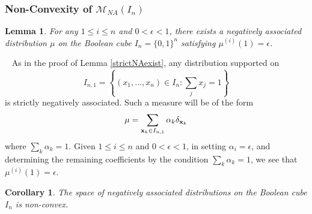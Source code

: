 \documentclass[11pt]{article}
\newcommand{\m}{\mathcal{M}}
\newtheorem{lemma}{Lemma}
\newtheorem{cor}{Corollary}
\newenvironment{Proof}{\noindent{\bf Proof} \ }{\QED}\smallskip
\newcommand\QED{\newline \rightline{$\blacksquare$} \bigskip}
\begin{document}
\subsubsection{Non-Convexity of $\m_{NA}(I_n)$}     

\begin{lemma}
 For any $1\leq i\leq n$ and $0<\epsilon<1$, there exists a negatively associated distribution $\mu$ on the Boolean cube $I_n=\{0,1\}^n$ satisfying $\mu^{(i)}(1)=\epsilon$.
\end{lemma}

\begin{Proof}
As in the proof of Lemma \ref{strictNAexist}, any distribution supported on \[
I_{n,1}=\left\{(x_1,\dots,x_n)\in I_n: \sum_j x_j =1\right\} 
\]
is strictly negatively associated. Such a measure will be of the form
\[
\mu=\sum_{{\bf x}_k \in I_{n,1}} \alpha_k \delta_{{\bf x}_k}
\]
where $\sum_k \alpha_k=1$. Given $1\leq i\leq n$ and $0<\epsilon<1$, in setting $\alpha_i =\epsilon$, and determining the remaining coefficients by the condition $\sum_k \alpha_k =1$, we see that $\mu^{(i)}(1)=\epsilon$.
\end{Proof}
                   
\begin{cor}
The space of negatively associated distributions on the Boolean cube $I_n$ is non-convex.
\end{cor}   
    
\end{document}
